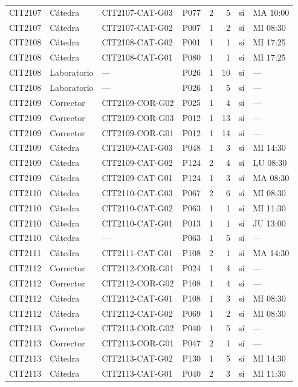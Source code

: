 \begin{longtable}{llllrrcl}
CIT2107 & Cátedra & CIT2107-CAT-G03 & P077 & 2 & 5 & sí & MA 10:00 \\
CIT2107 & Cátedra & CIT2107-CAT-G02 & P007 & 1 & 2 & sí & MI 08:30 \\
CIT2108 & Cátedra & CIT2108-CAT-G02 & P001 & 1 & 1 & sí & MI 17:25 \\
CIT2108 & Cátedra & CIT2108-CAT-G01 & P080 & 1 & 1 & sí & MI 17:25 \\
CIT2108 & Laboratorio & — & P026 & 1 & 10 & sí & — \\
CIT2108 & Laboratorio & — & P026 & 1 & 5 & sí & — \\
CIT2109 & Corrector & CIT2109-COR-G02 & P025 & 1 & 4 & sí & — \\
CIT2109 & Corrector & CIT2109-COR-G03 & P012 & 1 & 13 & sí & — \\
CIT2109 & Corrector & CIT2109-COR-G01 & P012 & 1 & 14 & sí & — \\
CIT2109 & Cátedra & CIT2109-CAT-G03 & P048 & 1 & 3 & sí & MI 14:30 \\
CIT2109 & Cátedra & CIT2109-CAT-G02 & P124 & 2 & 4 & sí & LU 08:30 \\
CIT2109 & Cátedra & CIT2109-CAT-G01 & P124 & 1 & 3 & sí & MA 08:30 \\
CIT2110 & Cátedra & CIT2110-CAT-G03 & P067 & 2 & 6 & sí & MI 08:30 \\
CIT2110 & Cátedra & CIT2110-CAT-G02 & P063 & 1 & 1 & sí & MI 11:30 \\
CIT2110 & Cátedra & CIT2110-CAT-G01 & P013 & 1 & 1 & sí & JU 13:00 \\
CIT2110 & Cátedra & — & P063 & 1 & 5 & sí & — \\
CIT2111 & Cátedra & CIT2111-CAT-G01 & P108 & 2 & 1 & sí & MA 14:30 \\
CIT2112 & Corrector & CIT2112-COR-G01 & P024 & 1 & 4 & sí & — \\
CIT2112 & Corrector & CIT2112-COR-G02 & P108 & 1 & 4 & sí & — \\
CIT2112 & Cátedra & CIT2112-CAT-G01 & P108 & 1 & 3 & sí & MI 08:30 \\
CIT2112 & Cátedra & CIT2112-CAT-G02 & P069 & 1 & 2 & sí & MI 08:30 \\
CIT2113 & Corrector & CIT2113-COR-G02 & P040 & 1 & 5 & sí & — \\
CIT2113 & Corrector & CIT2113-COR-G01 & P047 & 2 & 1 & sí & — \\
CIT2113 & Cátedra & CIT2113-CAT-G02 & P130 & 1 & 5 & sí & MI 14:30 \\
CIT2113 & Cátedra & CIT2113-CAT-G01 & P040 & 2 & 3 & sí & MI 11:30 \\

\end{longtable}
